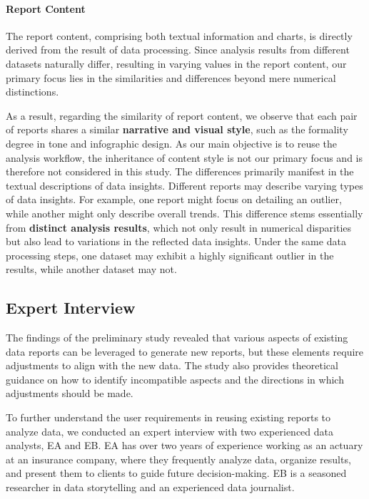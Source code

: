 \paragraph{Report Content}
The report content, comprising both textual information and charts, is directly derived from the result of data processing. 
Since analysis results from different datasets naturally differ, resulting in varying values in the report content, our primary focus lies in the similarities and differences beyond mere numerical distinctions. 

As a result, regarding the similarity of report content, we observe that each pair of reports shares a similar \textbf{narrative and visual style}, such as the formality degree in tone and infographic design. 
As our main objective is to reuse the analysis workflow, the inheritance of content style is not our primary focus and is therefore not considered in this study.
The differences primarily manifest in the textual descriptions of data insights. 
Different reports may describe varying types of data insights. 
For example, one report might focus on detailing an outlier, while another might only describe overall trends. 
This difference stems essentially from \textbf{distinct analysis results}, which not only result in numerical disparities but also lead to variations in the reflected data insights.
Under the same data processing steps, one dataset may exhibit a highly significant outlier in the results, while another dataset may not.

\subsection{Expert Interview}
The findings of the preliminary study revealed that various aspects of existing data reports can be leveraged to generate new reports, but these elements require adjustments to align with the new data. 
The study also provides theoretical guidance on how to identify incompatible aspects and the directions in which adjustments should be made. 

To further understand the user requirements in reusing existing reports to analyze data, we conducted an expert interview with two experienced data analysts, EA and EB. 
EA has over two years of experience working as an actuary at an insurance company, where they frequently analyze data, organize results, and present them to clients to guide future decision-making. 
EB is a seasoned researcher in data storytelling and an experienced data journalist. 

